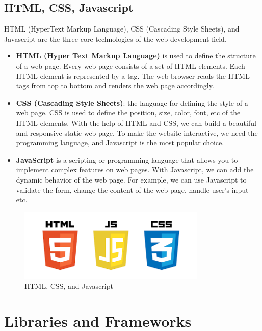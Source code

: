 \subsection{HTML, CSS, Javascript}
HTML (HyperText Markup Language), CSS (Cascading Style Sheets), and Javascript are the three core technologies of the web development field. 
\begin{itemize}

    \item \textbf{HTML (Hyper Text Markup Language)} is used to define the structure of a web page. Every web page consists of a set of HTML elements. Each HTML element is represented by a tag. The web browser reads the HTML tags from top to bottom and renders the web page accordingly.

    \item \textbf{CSS (Cascading Style Sheets)}: the language for defining the style of a web page. CSS is used to define the position, size, color, font, etc of the HTML elements. With the help of HTML and CSS, we can build a beautiful and responsive static web page. To make the website interactive, we need the programming language, and Javascript is the most popular choice.

    \item \textbf{JavaScript} is a scripting or programming language that allows you to implement complex features on web pages. With Javascript, we can add the dynamic behavior of the web page. For example, we can use Javascript to validate the form, change the content of the web page, handle user's input etc.
\end{itemize}

\begin{figure}[ht]
    \centering
    \includegraphics[width=0.8\textwidth]{../Images/8.Technology_Stack/html_css_js.png}
    \caption{HTML, CSS, and Javascript}
    \label{fig:html_css_javascript}
\end{figure}

\section{Libraries and Frameworks}
